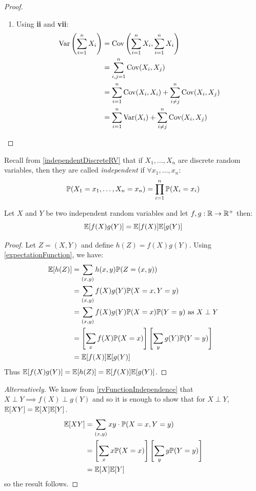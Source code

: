 \documentclass[../main.tex]{subfiles}
\begin{document}
\begin{proof}
\begin{enumerate}
    \item Using \textbf{ii} and \textbf{vii}:
      \begin{align*}
        \Var\left(\sum_{i = 1}^{n} X_i\right) &= \Cov\left(\sum_{i = 1}^{n} X_i, \sum_{i = 1}^{n} X_i\right) \\
                                              &= \sum_{i, j = 1}^{n} \Cov(X_i, X_j) \\
                                              &= \sum_{i = 1}^{n} \Cov(X_i, X_i) + \sum_{i \neq j}^{n} \Cov(X_i, X_j) \\
                                              &= \sum_{i = 1}^{n} \Var(X_i) + \sum_{i \neq j}^{n} \Cov(X_i, X_j)
      \end{align*}
  \end{enumerate}
\end{proof}
\begin{remark}[Recap]
  Recall from \cref{independentDiscreteRV} that if $X_1, \ldots, X_n$ are discrete random variables, then they are called \textit{independent} if $\forall x_1, \ldots, x_n$:
  \[
    \P(X_1 = x_1, \ldots, X_n = x_n) = \prod_{i = 1}^{n} \P(X_i = x_i)
  \]
\end{remark}
\begin{lemma}
  Let $X$ and $Y$ be two independent random variables and let $f, g: \R \to \R^{+}$ then:
  \label{expectationProduct}
  \[
    \E[f(X)g(Y)] = \E[f(X)]\E[g(Y)]
  \]
\end{lemma}
\begin{proof}
  Let $Z = (X, Y)$ and define $h(Z) = f(X)g(Y)$.
  Using \cref{expectationFunction}, we have:
  \begin{align*}
    \E[h(Z)] &= \sum_{(x, y)} h(x, y)\P(Z = (x, y)) \\
             &= \sum_{(x, y)} f(X)g(Y)\P(X = x, Y = y) \\
             &= \sum_{(x, y)} f(X)g(Y)\P(X = x)\P(Y = y) \text{ as $X \perp Y$}\\
             &= \left[\sum_{x} f(X)\P(X = x)\right]\left[\sum_{y} g(Y)\P(Y = y)\right] \\
             &= \E[f(X)]\E[g(Y)]
  \end{align*}
  Thus $\E[f(X)g(Y)] = \E[h(Z)] = \E[f(X)]\E[g(Y)]$.
\end{proof}
\begin{proof}[Alternatively]
  We know from \cref{rvFunctionIndependence} that $X \perp Y \implies f(X) \perp g(Y)$ and so it is enough to show that for $X \perp Y$, $\E[XY] = \E[X]\E[Y]$.
  \begin{align*}
    \E[XY] &= \sum_{(x, y)} xy \cdot \P(X = x, Y = y) \\
           &= \left[\sum_{x} x\P(X = x)\right]\left[\sum_{y} y\P(Y = y)\right] \\
           &= \E[X]\E[Y]
  \end{align*}
  so the result follows.
\end{proof}
\end{document}
